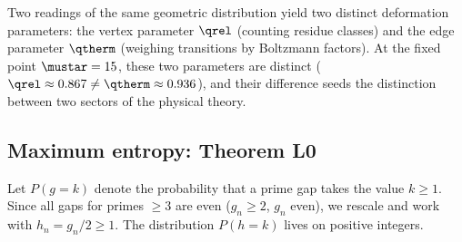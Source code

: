 \documentclass[12pt,a4paper]{article}
\begin{document}
Two readings of the same geometric distribution yield two distinct
deformation parameters: the vertex parameter $\qrel$ (counting
residue classes) and the edge parameter $\qtherm$ (weighing transitions
by Boltzmann factors). At the fixed point $\mustar = 15$, these two
parameters are distinct ($\qrel \approx 0.867 \neq \qtherm \approx 0.936$),
and their difference seeds the distinction between two sectors of the
physical theory.

\subsection{Maximum entropy: Theorem L0}
\label{sec:L0}

\begin{definition}
Let $P(g = k)$ denote the probability that a prime gap takes the value
$k \geq 1$. Since all gaps for primes $\geq 3$ are even ($g_n \geq 2$,
$g_n$ even), we rescale and work with $h_n = g_n/2 \geq 1$.
The distribution $P(h = k)$ lives on positive integers.
\end{definition}
\end{document}
